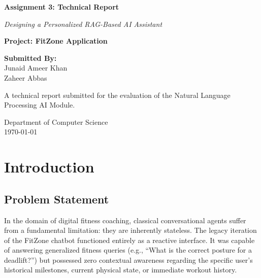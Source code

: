 \documentclass[12pt, a4paper]{report}
\begin{document}
\begin{titlepage}
    \begin{center}
        \vspace*{2cm}
        
        \Huge
        \textbf{Assignment 3: Technical Report}
        
        \vspace{0.5cm}
        \LARGE
        \textit{Designing a Personalized RAG-Based AI Assistant}
        
        \vspace{2cm}
        
        \textbf{Project: FitZone Application}
        
        \vspace{2cm}
        
        \Large
        \textbf{Submitted By:}\\
        Junaid Ameer Khan \\
        Zaheer Abbas
        
        \vfill
        
        A technical report submitted for the evaluation of the Natural Language Processing AI Module.
        
        \vspace{0.8cm}
        
        \Large
        Department of Computer Science\\
        \today
        
    \end{center}
\end{titlepage}

\tableofcontents
\newpage
\listoffigures
\newpage
\listoftables
\newpage


\chapter{Introduction}

\section{Problem Statement}
In the domain of digital fitness coaching, classical conversational agents suffer from a fundamental limitation: they are inherently stateless. The legacy iteration of the FitZone chatbot functioned entirely as a reactive interface. It was capable of answering generalized fitness queries (e.g., ``What is the correct posture for a deadlift?'') but possessed zero contextual awareness regarding the specific user's historical milestones, current physical state, or immediate workout history. 
\end{document}
